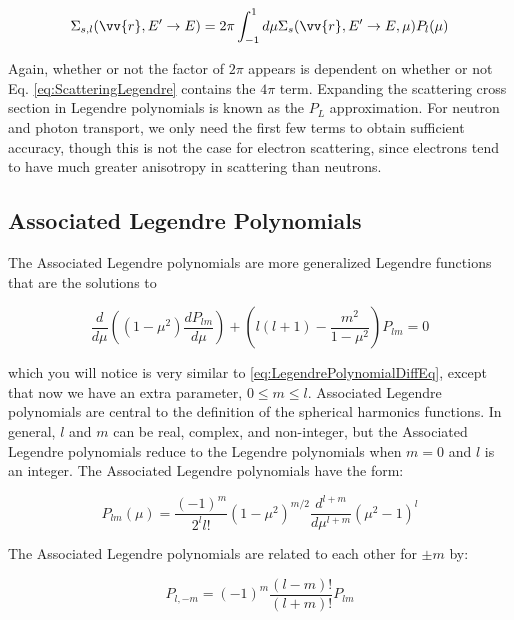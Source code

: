 \documentclass[10pt]{article}
\begin{document}
\begin{flushleft}
\begin{equation}
\label{eq:ScatteringMomentsLegendre}
\Sigma_{s,l}(\vv{r}, E'\rightarrow E) = 2\pi\int_{-1}^{1} d\mu \Sigma_s(\vv{r}, E'\rightarrow E, \mu) P_l(\mu)
\end{equation}

Again, whether or not the factor of \(2\pi\) appears is dependent on whether or not Eq. \ref{eq:ScatteringLegendre} contains the \(4\pi\) term. Expanding the scattering cross section in Legendre polynomials is known as the \(P_L\) approximation. For neutron and photon transport, we only need the first few terms to obtain sufficient accuracy, though this is not the case for electron scattering, since electrons tend to have much greater anisotropy in scattering than neutrons.

\subsection{Associated Legendre Polynomials}

The Associated Legendre polynomials are more generalized Legendre functions that are the solutions to

\begin{equation}
\label{eq:AssociatedLegendrePolynomialDiffEq}
\frac{d}{d\mu} \left((1-\mu^2) \frac{dP_{lm}}{d\mu}\right) + \left(l(l+1) -\frac{m^2}{1-\mu^2}\right)P_{lm} = 0
\end{equation}

which you will notice is very similar to \ref{eq:LegendrePolynomialDiffEq}, except that now we have an extra parameter, \(0 \leq m \leq l\). Associated Legendre polynomials are central to the definition of the spherical harmonics functions. In general, \(l\) and \(m\) can be real, complex, and non-integer, but the Associated Legendre polynomials reduce to the Legendre polynomials when \(m=0\) and \(l\) is an integer. The Associated Legendre polynomials have the form:

\begin{equation}
\label{eq:AssociatedLegendre}
P_{lm}(\mu)=\frac{(-1)^m}{2^ll!}(1-\mu^2)^{m/2}\frac{d^{l+m}}{d\mu^{l+m}}(\mu^2-1)^l
\end{equation}

The Associated Legendre polynomials are related to each other for \(\pm m\) by:

\begin{equation}
\label{eq:relatingALP}
P_{l,-m}=(-1)^m\frac{(l-m)!}{(l+m)!}P_{lm}
\end{equation}





\end{flushleft}
\end{document}
